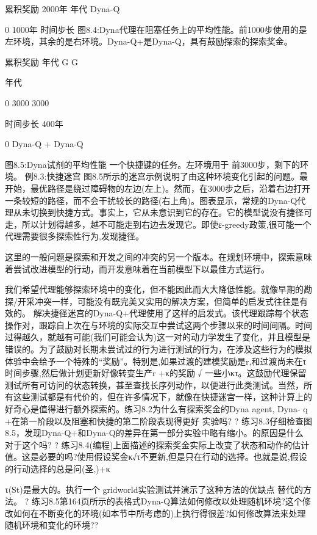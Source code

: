 累积奖励				2000年
年代		
					Dyna-Q	
						
	0	1000年			
时间步长
图8.4:Dyna代理在阻塞任务上的平均性能。前1000步使用的是左环境，其余的是右环境。Dyna-Q+是Dyna-Q，具有鼓励探索的探索奖金。

累积奖励
年代
G 					G

年代

0 3000 3000

时间步长
400年




0
Dyna-Q +
Dyna-Q

图8.5:Dyna试剂的平均性能
一个快捷键的任务。左环境用于
前3000步，剩下的环境。
例8.3:快捷迷宫
图8.5所示的迷宫示例说明了由这种环境变化引起的问题。最开始，最优路径是绕过障碍物的左边(左上)。然而，在3000步之后，沿着右边打开一条较短的路径，而不会干扰较长的路径(右上角)。图表显示，常规的Dyna-Q代理从未切换到快捷方式。事实上，它从未意识到它的存在。它的模型说没有捷径可走，所以计划得越多，越不可能走到右边去发现它。即使ε-greedy政策,很可能一个代理需要很多探索性行为,发现捷径。

这里的一般问题是探索和开发之间的冲突的另一个版本。在规划环境中，探索意味着尝试改进模型的行动，而开发意味着在当前模型下以最佳方式运行。

我们希望代理能够探索环境中的变化，但不能因此而大大降低性能。就像早期的勘探/开采冲突一样，可能没有既完美又实用的解决方案，但简单的启发式往往是有效的。
解决捷径迷宫的Dyna-Q+代理使用了这样的启发式。该代理跟踪每个状态操作对，跟踪自上次在与环境的实际交互中尝试这两个步骤以来的时间间隔。时间过得越久，就越有可能(我们可能会认为)这一对的动力学发生了变化，并且模型是错误的。为了鼓励对长期未尝试过的行为进行测试的行为，在涉及这些行为的模拟体验中会给予一个特殊的“奖励”。特别是,如果过渡的建模奖励是r,和过渡尚未在τ时间步骤,然后做计划更新好像转变生产r +κ的奖励
√
一些小κτ。这鼓励代理保留
测试所有可访问的状态转换，甚至查找长序列动作，以便进行此类测试。当然，所有这些测试都是有代价的，但在许多情况下，就像在快捷迷宫一样，这种计算上的好奇心是值得进行额外探索的。练习8.2为什么有探索奖金的Dyna agent, Dyna- q +在第一阶段以及阻塞和快捷的第二阶段表现得更好
实验吗? 					?
练习8.3仔细检查图8.5，发现Dyna-Q+和Dyna-Q的差异在第一部分实验中略有缩小。的原因是什么
对于这个吗? 					?
练习8.4(编程)上面描述的探索奖金实际上改变了状态和动作的估计值。这是必要的吗?使用假设奖金κ√τ不更新,但是只在行动的选择。也就是说,假设的行动选择的总是问(圣,)+κ

τ(St)是最大的。执行一个
gridworld实验测试并演示了这种方法的优缺点
替代的方法。 					?
练习8.5第164页所示的表格式Dyna-Q算法如何修改以处理随机环境?这个修改如何在不断变化的环境(如本节中所考虑的)上执行得很差?如何修改算法来处理随机环境和变化的环境??

